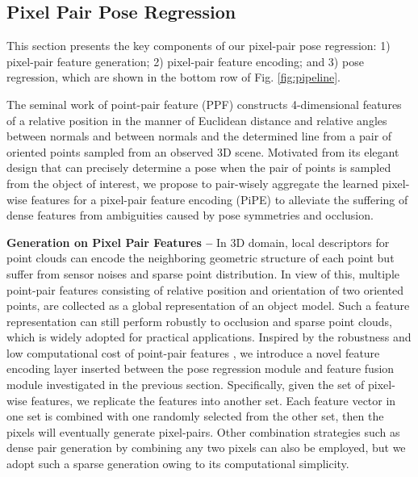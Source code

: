 \documentclass[letterpaper, 10 pt, conference]{ieeeconf}
\begin{document}
\subsection{Pixel Pair Pose Regression}\label{subsec:pppr}

This section presents the key components of our pixel-pair pose regression: 1) pixel-pair feature generation; 2) pixel-pair feature encoding; and 3) pose regression, which are shown in the bottom row of Fig. \ref{fig:pipeline}.

The seminal work of point-pair feature (PPF) \cite{drost2010model} constructs 4-dimensional features of a relative position in the manner of Euclidean distance and relative angles between normals and between normals and the determined line from a pair of oriented points sampled from an observed 3D scene. 
Motivated from its elegant design that can precisely determine a pose when the pair of points is sampled from the object of interest, we propose to pair-wisely aggregate the learned pixel-wise features for a pixel-pair feature encoding (PiPE) to alleviate the suffering of dense features from ambiguities caused by pose symmetries and occlusion.


\vspace{0.1cm}\noindent\textbf{Generation on Pixel Pair Features --} In 3D domain, local descriptors for point clouds can encode the neighboring geometric structure of each point but suffer from sensor noises and sparse point distribution.
In view of this, multiple point-pair features \cite{drost2010model} consisting of relative position and orientation of two oriented points, are collected as a global representation of an object model.
Such a feature representation can still perform robustly to occlusion and sparse point clouds, which is widely adopted for practical applications.
Inspired by the robustness and low computational cost of point-pair features \cite{drost2010model}, we introduce a novel feature encoding layer inserted between the pose regression module and feature fusion module investigated in the previous section.
Specifically, given the set  of  pixel-wise features, we replicate the features into another set.  
Each feature vector in one set is combined with one randomly selected from the other set, then the  pixels will eventually generate  pixel-pairs.
Other combination strategies such as dense pair generation by combining any two pixels can also be employed, but we adopt such a sparse generation owing to its computational simplicity.
\end{document}

